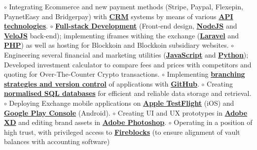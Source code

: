\documentclass[10pt,a4paper,ragged2e,withhyper]{altacv}
\begin{document}
\begin{adjustbox}{valign=t}
\begin{minipage}{0.6\textwidth}
\begin{description}
                    \textcolor{ColorOne}{$\circ$} Integrating Ecommerce and new payment methods (Stripe, Paypal, \newline Flexepin, PaynetEasy and Bridgerpay) with \underline{\textbf{CRM}} systems by means of \newline various \underline{\textbf{API technologies}}. \hfill\break
					\textcolor{ColorOne}{$\circ$}  \underline{\textbf{Full-stack Development}} (Front-end design, \underline{\textbf{NodeJS}} and \underline{\textbf{VeloJS}} \newline back-end); implementing iframes withing the exchange (\underline{\textbf{Laravel}} and \underline{\textbf{PHP}}) as well as hosting for Blockkoin and Blockkoin subsidiary websites. \hfill\break
                    \textcolor{ColorOne}{$\circ$} Engineering several financial and marketing utilities (\underline{\textbf{JavaScript}} and \underline{\textbf{Python}}); Developed investment calculator to compare fees and prices with competitors and quoting for Over-The-Counter Crypto transactions. \hfill\break
                  	 \textcolor{ColorOne}{$\circ$} Implementing  \underline{\textbf{branching strategies and version control}} of applications with \underline{\textbf{GitHub}}.\hfill\break
                     \textcolor{ColorOne}{$\circ$} Creating \underline{\textbf{normalised SQL databases}} for efficient and reliable data \newline storage and retrieval.\hfill\break
                    \textcolor{ColorOne}{$\circ$} Deploying Exchange mobile applications on \underline{\textbf{Apple TestFlight}} (iOS) and \underline{\textbf{Google Play Console}} (Android).\hfill\break
                    \textcolor{ColorOne}{$\circ$} Creating UI and UX prototypes in \underline{\textbf{Adobe XD}} and editing brand assets in \underline{\textbf{Adobe Photoshop}}.\hfill\break
                    \textcolor{ColorOne}{$\circ$} Operating in a position of high trust, with privileged access to \underline{\textbf{Fireblocks}} (to ensure alignment of vault balances with accounting software)\hfill\break
                \end{description} 

        \end{minipage}
    \end{adjustbox}
    
\end{document}
